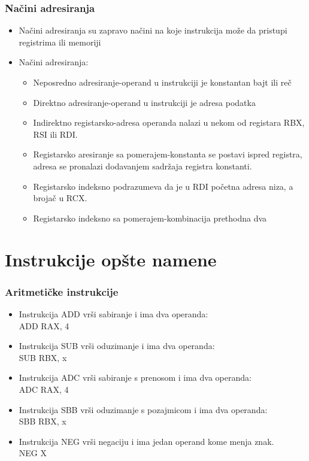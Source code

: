 \documentclass[hyperref={pdfpagelabels=false}]{beamer}
\begin{document}
	\begin{frame}
		\frametitle{Na\v cini adresiranja}
		\begin{itemize}
		\item \pause Na\v cini adresiranja su zapravo na\v cini na koje instrukcija mo\v ze da pristupi registrima ili memoriji\pause
		\item Na\v cini adresiranja:
			\begin{itemize}
				\item Neposredno adresiranje-operand u instrukciji je konstantan bajt ili re\v c \pause
				\item Direktno adresiranje-operand u instrukciji je adresa podatka \pause
				\item Indirektno registarsko-adresa operanda nalazi u nekom od registara RBX, RSI ili RDI.\pause
				\item Registarsko aresiranje sa pomerajem-konstanta se postavi ispred registra, adresa se pronalazi dodavanjem sadr\v zaja registra konstanti.\pause
				\item Registarsko indeksno podrazumeva da je u RDI po\v cetna adresa niza, a broja\v c u  RCX.\pause
				\item Registarsko indeksno sa pomerajem-kombinacija prethodna dva
			\end{itemize}
			\pause
		\end{itemize}
	\end{frame}
	
	
	
\section{Instrukcije op\v ste namene}
	\begin{frame}
		\frametitle{Aritmeti\v cke instrukcije} 
		\begin{itemize}
			\item \pause Instrukcija ADD vr\v si sabiranje i ima dva operanda: \pause \\
					ADD RAX, 4 \pause
			\item Instrukcija SUB vr\v si oduzimanje i ima dva operanda: \pause \\
					SUB RBX, x \pause
			\item Instrukcija ADC vr\v si sabiranje s prenosom i ima dva operanda:\pause \\
					ADC RAX, 4 \pause
			\item Instrukcija SBB vr\v si oduzimanje s pozajmicom i ima dva operanda:\pause \\
					SBB RBX, x \pause
			\item Instrukcija NEG vr\v si negaciju i ima jedan operand kome menja znak. \pause \\
					NEG X 
		\end{itemize}
	\end{frame}
	
\end{document}
